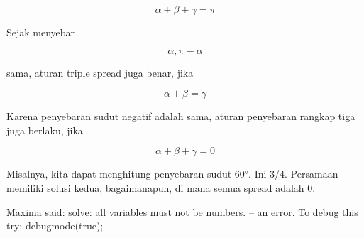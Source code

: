 \documentclass[a4paper,10pt]{article}
\begin{document}
\begin{eulernotebook}
\begin{eulercomment}
\begin{eulercomment}
\begin{eulercomment}
\begin{eulercomment}
\begin{eulercomment}
\begin{eulercomment}
\begin{eulercomment}
\begin{eulercomment}
\begin{eulercomment}
\begin{eulercomment}
\begin{eulercomment}
\begin{eulercomment}
\begin{eulercomment}
\begin{eulercomment}
\begin{eulercomment}
\begin{eulercomment}
\begin{eulercomment}
\end{eulercomment}
\begin{eulerformula}
\[
\alpha+\beta+\gamma=\pi
\]
\end{eulerformula}
\begin{eulercomment}
Sejak menyebar

\end{eulercomment}
\begin{eulerformula}
\[
\alpha, \pi-\alpha
\]
\end{eulerformula}
\begin{eulercomment}
sama, aturan triple spread juga benar, jika

\end{eulercomment}
\begin{eulerformula}
\[
\alpha+\beta=\gamma
\]
\end{eulerformula}
\begin{eulercomment}
Karena penyebaran sudut negatif adalah sama, aturan penyebaran rangkap
tiga juga berlaku, jika

\end{eulercomment}
\begin{eulerformula}
\[
\alpha+\beta+\gamma=0
\]
\end{eulerformula}
\begin{eulercomment}
Misalnya, kita dapat menghitung penyebaran sudut 60°. Ini 3/4.
Persamaan memiliki solusi kedua, bagaimanapun, di mana semua spread
adalah 0.
\end{eulercomment}
\begin{euleroutput}
  Maxima said:
  solve: all variables must not be numbers.
   -- an error. To debug this try: debugmode(true);
  

\end{euleroutput}
\end{eulercomment}
\end{eulercomment}
\end{eulercomment}
\end{eulercomment}
\end{eulercomment}
\end{eulercomment}
\end{eulercomment}
\end{eulercomment}
\end{eulercomment}
\end{eulercomment}
\end{eulercomment}
\end{eulercomment}
\end{eulercomment}
\end{eulercomment}
\end{eulercomment}
\end{eulercomment}
\end{eulernotebook}
\end{document}
